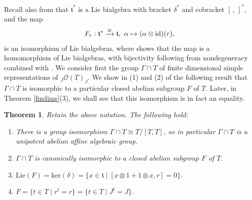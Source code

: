 \documentclass{amsart}
\numberwithin{equation}{section}
\newtheorem{theorem}{Theorem}[section]
\theoremstyle{definition}
\begin{document}
Recall also from \cite[Proposition 2.2]{ES} that $\mathfrak{t}^*$ is a Lie bialgebra with bracket $\delta^*$ and cobracket $[\,,\,]^*$, and the map 
\begin{equation}\label{liealgselfdual}
F_r:\mathfrak{t}^*\xrightarrow{\cong}\mathfrak{t},\,\,\alpha \mapsto (\alpha\otimes {\rm id})(r),
\end{equation}
is an isomorphism of Lie bialgebras, where \cite[Proposition 2.1.4]{CP} shows that the map is a homomorphism of Lie bialgebras, with bijectivity following from nondegeneracy combined with \cite[Proposition 3.2]{ES}. 
We consider first the group $\Gamma \cap T$ of finite dimensional simple representations of ${}_J\mathcal{O}(T)_J$. We show in (1) and (2) of the following result that $\Gamma \cap T$ is isomorphic to a particular closed abelian subgroup $F$ of $T$. Later, in Theorem \ref{findims}(3), we shall see that this isomorphism is in fact an equality.

\begin{theorem}\label{strfindimsF} 
Retain the above notation. The following hold:
\begin{enumerate}
\item
There is a group isomorphism $\Gamma \cap T \cong T/[T,T]$, so in particular $\Gamma \cap T$ is a unipotent abelian affine algebraic group. 
\item
$\Gamma \cap T$ is canonically isomorphic to a closed abelian subgroup $F$ of $T$.
\item 
$\mathrm{Lie}(F)= \mathrm{ker}(\delta) = \{x\in \mathfrak{t}\mid [x\otimes 1 +1\otimes x,r]=0\}$. 
\item
$F =\{t\in T \mid r^t = r\}=\{t \in T \mid J^t = J \}$.
\end{enumerate}
\end{theorem} 
\end{document}
